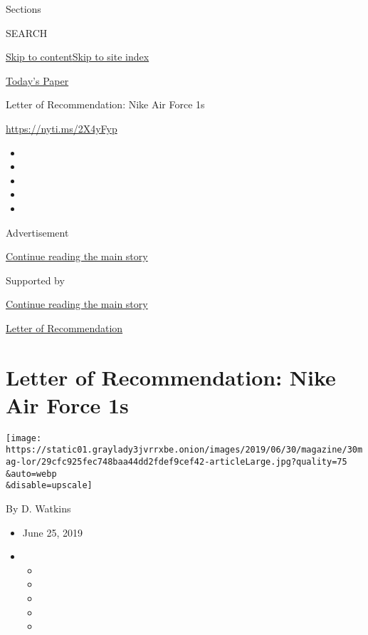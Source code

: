 Sections

SEARCH

\protect\hyperlink{site-content}{Skip to
content}\protect\hyperlink{site-index}{Skip to site index}

\href{https://myaccount.nytimes3xbfgragh.onion/auth/login?response_type=cookie\&client_id=vi}{}

\href{https://www.nytimes3xbfgragh.onion/section/todayspaper}{Today's
Paper}

Letter of Recommendation: Nike Air Force 1s

\url{https://nyti.ms/2X4yFyp}

\begin{itemize}
\item
\item
\item
\item
\item
\end{itemize}

Advertisement

\protect\hyperlink{after-top}{Continue reading the main story}

Supported by

\protect\hyperlink{after-sponsor}{Continue reading the main story}

\href{/column/letter-of-recommendation}{Letter of Recommendation}

\hypertarget{letter-of-recommendation-nike-air-force-1s}{%
\section{Letter of Recommendation: Nike Air Force
1s}\label{letter-of-recommendation-nike-air-force-1s}}

\texttt{[image: https://static01.graylady3jvrrxbe.onion/images/2019/06/30/magazine/30mag-lor/29cfc925fec748baa44dd2fdef9cef42-articleLarge.jpg?quality=75\\\&auto=webp\\\&disable=upscale]}

By D. Watkins

\begin{itemize}
\item
  June 25, 2019
\item
  \begin{itemize}
  \item
  \item
  \item
  \item
  \item
  \end{itemize}
\end{itemize}

